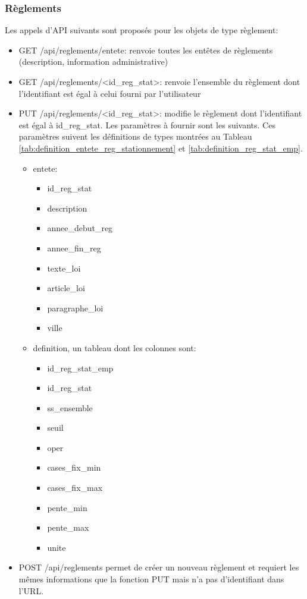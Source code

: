 \subsubsection{Règlements}
Les appels d'\ac{API} suivants sont proposés pour les objets de type règlement:
\begin{itemize}
    \item GET /api/reglements/entete: renvoie toutes les entêtes de règlements (description, information administrative)
    \item GET /api/reglements/<id\_reg\_stat>: renvoie l'ensemble du règlement dont l'identifiant est égal à celui fourni par l'utilisateur
    \item PUT /api/reglements/<id\_reg\_stat>: modifie le règlement dont l'identifiant est égal à id\_reg\_stat. Les paramètres à fournir sont les suivants. Ces paramètres suivent les définitions de types montrées au Tableau \ref{tab:definition_entete_reg_stationnement} et \ref{tab:definition_reg_stat_emp}.
        \begin{itemize}
            \item entete:
                \begin{itemize}
                    \item id\_reg\_stat
                    \item description
                    \item annee\_debut\_reg
                    \item annee\_fin\_reg
                    \item texte\_loi
                    \item article\_loi
                    \item paragraphe\_loi
                    \item ville
                \end{itemize}
            \item definition, un tableau dont les colonnes sont:
                \begin{itemize}
                    \item id\_reg\_stat\_emp
                    \item id\_reg\_stat
                    \item ss\_ensemble
                    \item seuil
                    \item oper
                    \item cases\_fix\_min
                    \item cases\_fix\_max
                    \item pente\_min
                    \item pente\_max
                    \item unite
                \end{itemize}
        \end{itemize}
    \item POST /api/reglements permet de créer un nouveau règlement et requiert les mêmes informations que la fonction PUT mais n'a pas d'identifiant dans l'\ac{URL}.
\end{itemize}\clearpage
